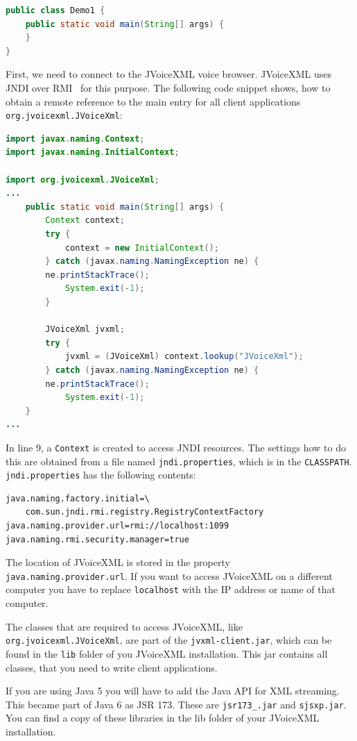 \documentclass[11pt,a4paper]{article}
\begin{document}
\begin{lstlisting}[language=Java]
public class Demo1 {
    public static void main(String[] args) {
    }
}
\end{lstlisting}

First, we need to connect to the JVoiceXML voice browser. JVoiceXML
uses JNDI over RMI~\cite{sun:rmi,sun:rmi_jndi} for this purpose. 
The following code snippet
shows, how to obtain a remote reference to the main entry for
all client applications \texttt{org.jvoicexml.JVoiceXml}:

\begin{lstlisting}[language=Java]
import javax.naming.Context;
import javax.naming.InitialContext;

import org.jvoicexml.JVoiceXml;
...
    public static void main(String[] args) {
        Context context;
        try {
            context = new InitialContext();
        } catch (javax.naming.NamingException ne) {
	    ne.printStackTrace();
            System.exit(-1);
        }

        JVoiceXml jvxml;
        try {
            jvxml = (JVoiceXml) context.lookup("JVoiceXml");
        } catch (javax.naming.NamingException ne) {
	    ne.printStackTrace();
            System.exit(-1);
    }
...
\end{lstlisting}

In line 9, a \texttt{Context} is created to access JNDI resources.
The settings how to do this are obtained from a file named
\texttt{jndi.properties}, which is in the \texttt{CLASSPATH}.
\texttt{jndi.properties} has the following contents:

\begin{lstlisting}
java.naming.factory.initial=\
    com.sun.jndi.rmi.registry.RegistryContextFactory
java.naming.provider.url=rmi://localhost:1099
java.naming.rmi.security.manager=true
\end{lstlisting}

The location of JVoiceXML is stored in the property 
\texttt{java.naming.pro\-vider.url}. If you want to access JVoiceXML on a 
different computer you have to replace \texttt{localhost} with the IP address 
or name of that computer.

The classes  that are required to access JVoiceXML, like 
\texttt{org.jvoice\-xml.JVoiceXml}, are part of the
\texttt{jvxml-client.jar}, which can be found in the \texttt{lib}
folder of you JVoiceXML installation. This jar contains all classes, that you 
need to write client applications.

If you are using Java 5 you will have to add the Java API for XML streaming.
This became part of Java 6 as JSR 173. These are \texttt{jsr173\_\-1.0.jar} and
\texttt{sjsxp.jar}. You can find a copy of these libraries in the lib folder of your JVoiceXML installation.
\end{document}
